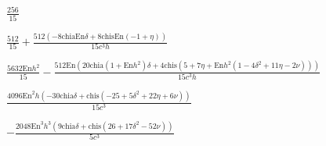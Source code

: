\documentclass{article}
\begin{document}
\begin{doublespace}
\noindent\(\frac{256}{15}\)
\end{doublespace}

\begin{doublespace}
\noindent\(\frac{512}{15}+\frac{512 (-8 \text{chia} \text{En} \delta +8 \text{chis} \text{En} (-1+\eta ))}{15 c^3 h}\)
\end{doublespace}

\begin{doublespace}
\noindent\(\frac{5632 \text{En} h^2}{15}-\frac{512 \text{En} \left(20 \text{chia} \left(1+\text{En} h^2\right) \delta +4 \text{chis} \left(5+7 \eta
+\text{En} h^2 \left(1-4 \delta ^2+11 \eta -2 \nu \right)\right)\right)}{15 c^3 h}\)
\end{doublespace}

\begin{doublespace}
\noindent\(\frac{4096 \text{En}^2 h \left(-30 \text{chia} \delta +\text{chis} \left(-25+5 \delta ^2+22 \eta +6 \nu \right)\right)}{15 c^3}\)
\end{doublespace}

\begin{doublespace}
\noindent\(-\frac{2048 \text{En}^3 h^3 \left(9 \text{chia} \delta +\text{chis} \left(26+17 \delta ^2-52 \nu \right)\right)}{5 c^3}\)
\end{doublespace}
\end{document}
